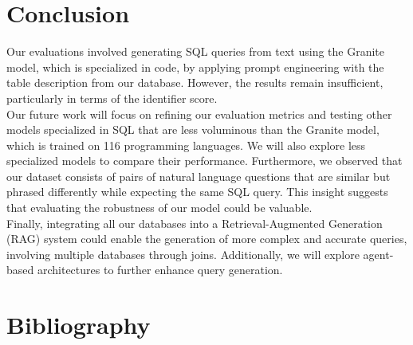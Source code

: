 \documentclass[12pt,a4paper]{article}
\begin{document}
  
\section*{Conclusion}

Our evaluations involved generating SQL queries from text using the Granite model, which is specialized in code, by applying prompt engineering with the table description from our database. However, the results remain insufficient, particularly in terms of the identifier score.\\

Our future work will focus on refining our evaluation metrics and testing other models specialized in SQL that are less voluminous than the Granite model, which is trained on 116 programming languages. We will also explore less specialized models to compare their performance.
Furthermore, we observed that our dataset consists of pairs of natural language questions that are similar but phrased differently while expecting the same SQL query. This insight suggests that evaluating the robustness of our model could be valuable.\\

Finally, integrating all our databases into a Retrieval-Augmented Generation (RAG) system could enable the generation of more complex and accurate queries, involving multiple databases through joins. Additionally, we will explore agent-based architectures to further enhance query generation.

\section*{Bibliography}


\end{document}
